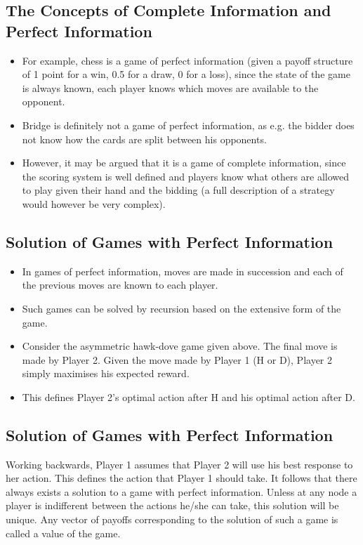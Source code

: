 \documentclass[]{report}
\begin{document}
\subsection{The Concepts of Complete Information and Perfect
Information}
\begin{itemize}
	\item For example, chess is a game of perfect information (given a payoff
	structure of 1 point for a win, 0.5 for a draw, 0 for a loss), since
	the state of the game is always known, each player knows which
	moves are available to the opponent.
\item Bridge is definitely not a game of perfect information, as e.g. the
	bidder does not know how the cards are split between his
	opponents. 
	\item However, it may be argued that it is a game of
	complete information, since the scoring system is well defined and
	players know what others are allowed to play given their hand and
	the bidding (a full description of a strategy would however be very
	complex).
\end{itemize}


\subsection{Solution of Games with Perfect Information}
\begin{itemize}
\item In games of perfect information, moves are made in succession and
each of the previous moves are known to each player.
\item Such games can be solved by recursion based on the extensive
form of the game.
\item Consider the asymmetric hawk-dove game given above. The final
move is made by Player 2. Given the move made by Player 1 (H or
D), Player 2 simply maximises his expected reward.
\item This defines Player 2’s optimal action after H and his optimal
action after D.
\end{itemize}


\subsection{Solution of Games with Perfect Information}
Working backwards, Player 1 assumes that Player 2 will use his
best response to her action.
This defines the action that Player 1 should take.
It follows that there always exists a solution to a game with perfect
information. Unless at any node a player is indifferent between the
actions he/she can take, this solution will be unique.
Any vector of payoffs corresponding to the solution of such a game
is called a value of the game.
\end{document}
